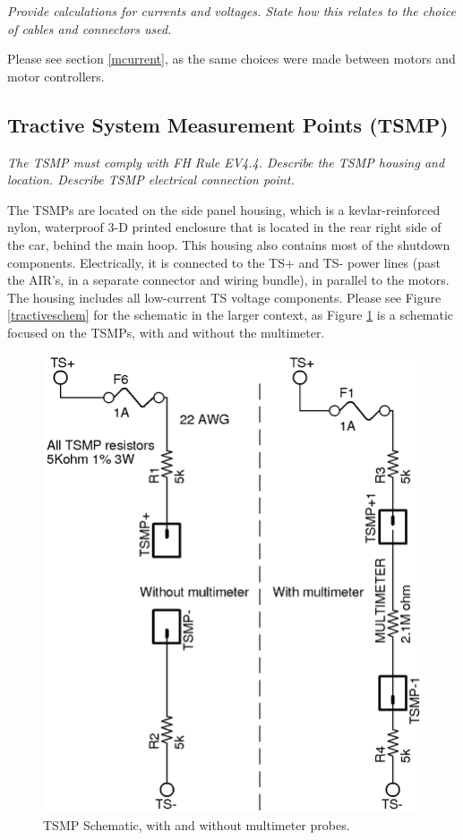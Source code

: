 \documentclass{article}
\begin{document}
    \textit{Provide calculations for currents and voltages. State how this relates to the choice of cables and connectors used.}

    Please see section \ref{mcurrent}, as the same choices were made between motors and motor controllers.

    \subsection{Tractive System Measurement Points (TSMP)}

    \textit{The TSMP must comply with FH Rule EV4.4. Describe the TSMP housing and location. Describe TSMP electrical connection point.}

    The TSMPs are located on the side panel housing, which is a kevlar-reinforced nylon, waterproof 3-D printed enclosure that is located in the rear right side of the car, behind the main hoop. This housing also contains most of the shutdown components. Electrically, it is connected to the TS+ and TS- power lines (past the AIR's, in a separate connector and wiring bundle), in parallel to the motors. The housing includes all low-current TS voltage components. Please see Figure \ref{tractiveschem} for the schematic in the larger context, as Figure \ref{tsmpschem} is a schematic focused on the TSMPs, with and without the multimeter.

    \begin{figure}
        \centering
        \includegraphics{TSMP}
        \caption{TSMP Schematic, with and without multimeter probes.}
        \label{tsmpschem}
    \end{figure}
\end{document}
